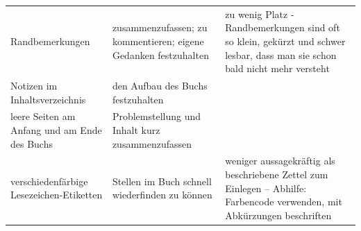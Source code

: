 \documentclass[]{book}
\theoremstyle{definition}
\theoremstyle{definition}
\theoremstyle{definition}
\theoremstyle{remark}
\begin{document}
\begin{longtable}[]{@{}lll@{}}
\begin{minipage}[t]{0.31\columnwidth}
Randbemerkungen\strut
\end{minipage} & \begin{minipage}[t]{0.27\columnwidth}\raggedright\strut
zusammenzufassen; zu kommentieren; eigene Gedanken festzuhalten\strut
\end{minipage} & \begin{minipage}[t]{0.33\columnwidth}\raggedright\strut
zu wenig Platz - Randbemerkungen sind oft so klein, gekürzt und schwer
lesbar, dass man sie schon bald nicht mehr versteht \vspace{5mm}\strut
\end{minipage}\tabularnewline
\begin{minipage}[t]{0.31\columnwidth}\raggedright\strut
Notizen im Inhaltsverzeichnis\strut
\end{minipage} & \begin{minipage}[t]{0.27\columnwidth}\raggedright\strut
den Aufbau des Buchs festzuhalten \vspace{5mm}\strut
\end{minipage} & \begin{minipage}[t]{0.33\columnwidth}\raggedright\strut
\strut
\end{minipage}\tabularnewline
\begin{minipage}[t]{0.31\columnwidth}\raggedright\strut
leere Seiten am Anfang und am Ende des Buchs\strut
\end{minipage} & \begin{minipage}[t]{0.27\columnwidth}\raggedright\strut
Problemstellung und Inhalt kurz zusammenzufassen \vspace{5mm}\strut
\end{minipage} & \begin{minipage}[t]{0.33\columnwidth}\raggedright\strut
\strut
\end{minipage}\tabularnewline
\begin{minipage}[t]{0.31\columnwidth}\raggedright\strut
verschiedenfärbige Lesezeichen-Etiketten\strut
\end{minipage} & \begin{minipage}[t]{0.27\columnwidth}\raggedright\strut
Stellen im Buch schnell wiederfinden zu können\strut
\end{minipage} & \begin{minipage}[t]{0.33\columnwidth}\raggedright\strut
weniger aussagekräftig als beschriebene Zettel zum Einlegen -- Abhilfe:
Farbencode verwenden, mit Abkürzungen beschriften\strut
\end{minipage}\tabularnewline
\bottomrule
\end{longtable}
\end{document}
